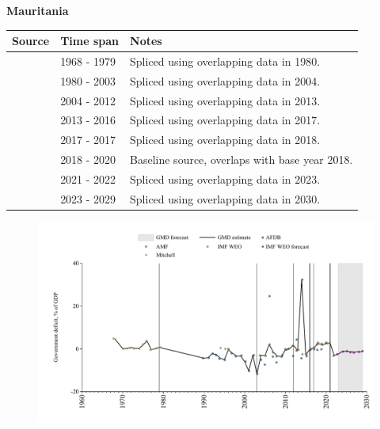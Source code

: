 \documentclass[12pt,a4paper,landscape]{article}
\begin{document}
\begin{adjustbox}{max totalsize={\paperwidth}{\paperheight},center}
\begin{minipage}[t][\textheight][t]{\textwidth}
\vspace*{0.5cm}
{}
\begin{center}
{\Large\bfseries Mauritania}
\end{center}
\vspace{0.5cm}
\begin{table}[H]
\centering
\small
\begin{tabular}{|l|l|l|}
\hline
\textbf{Source} & \textbf{Time span} & \textbf{Notes} \\
\hline
\rowcolor{white}\cite{Mitchell}& 1968 - 1979 &Spliced using overlapping data in 1980.\\
\rowcolor{lightgray}\cite{AFDB}& 1980 - 2003 &Spliced using overlapping data in 2004.\\
\rowcolor{white}\cite{IMF_WEO}& 2004 - 2012 &Spliced using overlapping data in 2013.\\
\rowcolor{lightgray}\cite{AMF}& 2013 - 2016 &Spliced using overlapping data in 2017.\\
\rowcolor{white}\cite{IMF_WEO}& 2017 - 2017 &Spliced using overlapping data in 2018.\\
\rowcolor{lightgray}\cite{AMF}& 2018 - 2020 &Baseline source, overlaps with base year 2018.\\
\rowcolor{white}\cite{IMF_WEO}& 2021 - 2022 &Spliced using overlapping data in 2023.\\
\rowcolor{lightgray}\cite{IMF_WEO_forecast}& 2023 - 2029 &Spliced using overlapping data in 2030.\\
\hline
\end{tabular}
\end{table}
\begin{figure}[H]
\centering
\includegraphics[width=\textwidth,height=0.6\textheight,keepaspectratio]{graphs/MRT_govdef_GDP.pdf}
\end{figure}
\end{minipage}
\end{adjustbox}
\end{document}
